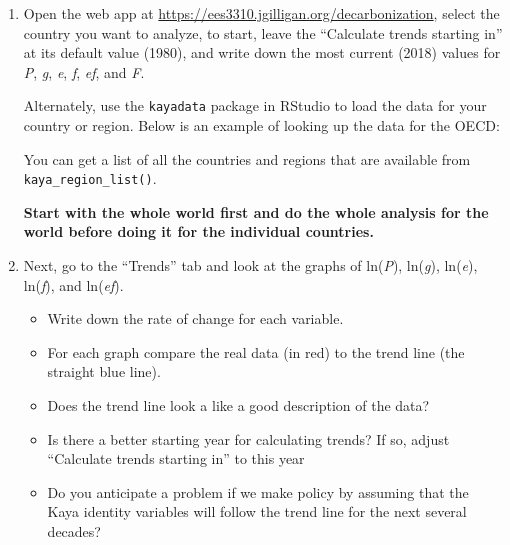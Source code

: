 \documentclass[
]{article}
\newenvironment{Shaded}{\begin{snugshade}}{\end{snugshade}}
\newcommand{\DecValTok}[1]{\textcolor[rgb]{0.00,0.00,0.81}{#1}}
\newcommand{\KeywordTok}[1]{\textcolor[rgb]{0.13,0.29,0.53}{\textbf{#1}}}
\newcommand{\NormalTok}[1]{#1}
\newcommand{\OperatorTok}[1]{\textcolor[rgb]{0.81,0.36,0.00}{\textbf{#1}}}
\newcommand{\StringTok}[1]{\textcolor[rgb]{0.31,0.60,0.02}{#1}}
\providecommand{\tightlist}{%
  \setlength{\itemsep}{0pt}\setlength{\parskip}{0pt}}
\begin{document}
\begin{enumerate}
\def\labelenumi{\arabic{enumi}.}
\item
  Open the web app at
  \url{https://ees3310.jgilligan.org/decarbonization}, select the
  country you want to analyze, to start, leave the ``Calculate trends
  starting in'' at its default value (1980), and write down the most
  current (2018) values for \emph{P}, \emph{g}, \emph{e}, \emph{f},
  \emph{ef}, and \emph{F}.

  Alternately, use the \texttt{kayadata} package in RStudio to load the
  data for your country or region. Below is an example of looking up the
  data for the OECD:

\begin{Shaded}
\end{Shaded}

  You can get a list of all the countries and regions that are available
  from \texttt{kaya\_region\_list()}.

  \textbf{Start with the whole world first and do the whole analysis for
  the world before doing it for the individual countries.}
\item
  Next, go to the ``Trends'' tab and look at the graphs of ln(\emph{P}),
  ln(\emph{g}), ln(\emph{e}), ln(\emph{f}), and ln(\emph{ef}).

  \begin{itemize}
  \tightlist
  \item
    Write down the rate of change for each variable.
  \item
    For each graph compare the real data (in red) to the trend line (the
    straight blue line).
  \item
    Does the trend line look a like a good description of the data?
  \item
    Is there a better starting year for calculating trends? If so,
    adjust ``Calculate trends starting in'' to this year
  \item
    Do you anticipate a problem if we make policy by assuming that the
    Kaya identity variables will follow the trend line for the next
    several decades?
  \end{itemize}


\end{enumerate}
\end{document}
